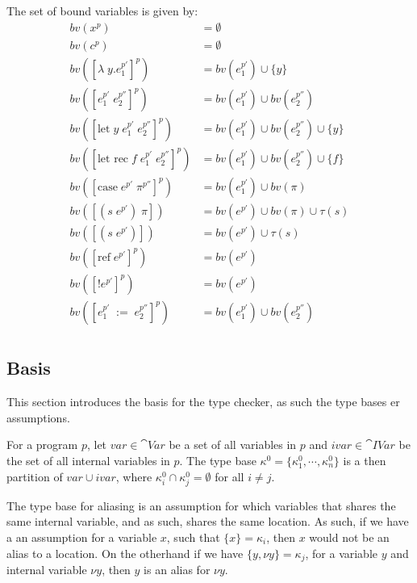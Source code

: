 \documentclass[../../master.tex]{subfiles}
\begin{document}
\begin{definition}
	The set of bound variables is given by:
	\begin{align*}
		bv(x^p)&=\emptyset\\
		bv(c^p)&=\emptyset\\
		bv([\lambda\;y.e_1^{p'}]^p)&=bv(e_1^{p'})\cup\{y\}\\
		bv([e_1^{p'}\;e_2^{p''}]^p)&=bv(e_1^{p'})\cup bv(e_2^{p''})\\
		bv([\mbox{let}\;y\;e_1^{p'}\;e_2^{p''}]^p)&=bv(e_1^{p'})\cup bv(e_2^{p''})\cup\{y\}\\
		bv([\mbox{let rec}\;f\;e_1^{p'}\;e_2^{p''}]^p)&=bv(e_1^{p'})\cup bv(e_2^{p''})\cup\{f\}\\
		bv([\mbox{case}\;e^{p'}\;\pi^{p''}]^p)&=bv(e_1^{p'})\cup bv(\pi)\\
		bv([(s\;e^{p'})\;\pi])&=bv(e^{p'})\cup bv(\pi)\cup\tau(s)\\
		bv([(s\;e^{p'})])&=bv(e^{p'})\cup\tau(s)\\
		bv([\mbox{ref}\;e^{p'}]^p)&=bv(e^{p'})\\
		bv([!e^{p'}]^p)&=bv(e^{p'})\\
		bv([e_1^{p'}\;:=\;e_2^{p''}]^p)&=bv(e_1^{p'})\cup bv(e_2^{p''})\\
	\end{align*}
\end{definition}


\subsection{Basis}
This section introduces the basis for the type checker, as such the type bases er assumptions.
\begin{definition}
	For a program $p$, let $var\in\cat{Var}$ be a set of all variables in $p$ and $ivar\in\cat{IVar}$ be the set of all internal variables in $p$.
	The type base $\kappa^0=\{\kappa^0_1,\cdots,\kappa^0_n\}$ is a then partition of $var\cup ivar$, where $\kappa_i^0\cap\kappa_j^0=\emptyset$ for all $i\neq j$.
\end{definition}
The type base for aliasing is an assumption for which variables that shares the same internal variable, and as such, shares the same location.
As such, if we have a an assumption for a variable $x$, such that $\{x\}=\kappa_i$, then $x$ would not be an alias to a location.
On the otherhand if we have $\{y,\nu y\}=\kappa_j$, for a variable $y$ and internal variable $\nu y$, then $y$ is an alias for $\nu y$.
\end{document}
